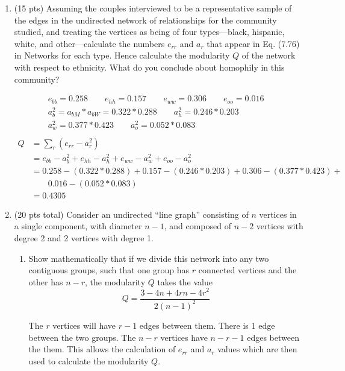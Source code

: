 \documentclass[12pt,letterpaper]{article}
\begin{document}
\begin{enumerate}
\itemsep1em

    \item  (15 pts) Assuming the couples interviewed to be a representative sample of the edges in the undirected network of relationships for the community studied, and treating the vertices as being of four types—black, hispanic, white, and other—calculate the numbers $e_{rr}$ and $a_r$ that appear in Eq. (7.76) in Networks for each type. Hence calculate the modularity $Q$ of the network with respect to ethnicity. What do you conclude about homophily in this community?

    \begin{align*}
        & \qquad e_{bb} = 0.258 \qquad e_{hh} = 0.157 \qquad e_{ww} = 0.306 \qquad e_{oo} = 0.016 \\
        & \qquad a_b^2 = a_{bM}*a_{bW} = 0.322*0.288 \qquad  a_h^2 = 0.246*0.203 \\
        & \qquad a_w^2 = 0.377*0.423 \qquad a_o^2 = 0.052*0.083 \\ \\
        Q &= \sum_{r} (e_{rr} - a_r^2) \\
        &= e_{bb} - a_b^2 + e_{hh} - a_h^2 + e_{ww} - a_w^2 + e_{oo} - a_o^2 \\
        &= 0.258 - (0.322*0.288) + 0.157 - (0.246*0.203) + 0.306 - (0.377*0.423) + \\& \qquad 0.016 - (0.052*0.083) \\
        &= 0.4305
    \end{align*}

    \newpage
    \item (20 pts total) Consider an undirected “line graph” consisting of $n$ vertices in a single component, with diameter $n - 1$, and composed of $n - 2$ vertices with degree 2 and 2 vertices with degree 1.
    \begin{enumerate}
    \itemsep1em
        \item Show mathematically that if we divide this network into any two contiguous groups, such that one group has $r$ connected vertices and the other has $n - r$, the modularity $Q$ takes the value
        $$Q = \frac{3 - 4n + 4rn - 4r^{2}}{2(n - 1)^2}$$

        The $r$ vertices will have $r-1$ edges between them. There is $1$ edge between the two groups. The $n-r$ vertices have $n-r-1$ edges between the them. This allows the calculation of $e_{rr}$ and $a_r$ values which are then used to calculate the modularity $Q$.


\end{enumerate}
\end{enumerate}
\end{document}
